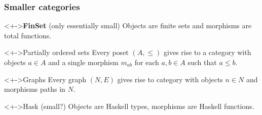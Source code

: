 \documentclass{beamer}
\begin{document}
\begin{frame}
  \frametitle{Smaller categories}
  \begin{block}<+->{\textbf{FinSet} (only essentially small)}
    Objects are finite sets and morphisms are total functions.
  \end{block}
  \begin{block}<+->{Partially ordered sets}
    Every poset $(A, \le)$ gives rise to a category with objects $a\in
    A$ and a single morphism $m_{ab}$ for each $a, b\in A$ such that
    $a \le b$. 
  \end{block}
  \begin{block}<+->{Graphs}
    Every graph $(N, E)$ gives rise to category with objects $n\in N$
    and morphisms paths in $N$.
  \end{block}
  \begin{block}<+->{Hask (small?)}
    Objects are Haskell types, morphisms are Haskell functions.
  \end{block}
\end{frame}
\end{document}

